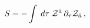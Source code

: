 \begin{equation}\label{24}
S=-\int\;d \tau\;{\cal Z}^{\hat a}\,\partial_\tau{\cal Z}_{\hat
a}\,,
\end{equation}

